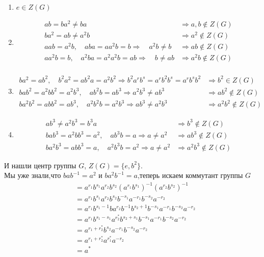 \documentclass[12pt]{article} %
\theoremstyle{neosn} %
\begin{document}
\begin{enumerate}
	\item $e \in Z(G)$
	\item \begin{align*}
		ab = ba^2 \neq ba &\Rightarrow a,b \notin Z(G) \\
		ba^2=ab\neq a^2b &\Rightarrow a^2 \notin Z(G) \\
		aab=a^2b, \quad aba = aa^2b=b \Rightarrow \quad a^2b \neq b &\Rightarrow ab \notin Z(G)\\
		aa^2b=b, \quad a^2ba=a^2a^2b=ab \Rightarrow \quad b \neq ab &\Rightarrow a^2b \notin Z(G)\\
	\end{align*}
	\item \begin{align*}
		ba^2 = ab^2,\quad b^2a^2=ab^2a=a^2b^2 \Rightarrow b^2a^rb^s=a^rb^2b^s=a^rb^sb^2 &\Rightarrow b^2 \in Z(G)\\
		bab^2=a^2bb^2=a^2b^3,\quad ab^2b=ab^3 \Rightarrow a^2b^3 \neq ab^3 &\Rightarrow ab^2 \notin Z(G)\\
		ba^2b^2=abb^2=ab^3, \quad a^2b^2b=a^2b^3 \Rightarrow ab^3\neq a^2b^3 &\Rightarrow a^2b^2 \notin Z(G)
	\end{align*}
	\item \begin{align*}
		ab^3\neq a^2b^3=b^3a &\Rightarrow b^3 \notin Z(G)\\
		bab^3=a^2bb^3=a^2, \quad ab^3b=a \Rightarrow a \neq a^2 &\Rightarrow ab^3 \notin Z(G)\\
		ba^2b^3=abb^3=a,\quad a^2b^3b=a^2 \Rightarrow a \neq a^2 &\Rightarrow a^2b^3 \notin Z(G)
	\end{align*}
\end{enumerate}
И нашли центр группы $G$, $Z(G)=\{e,b^2\}$.\\

Мы уже знали,что $bab^{-1}=a^2$ и $ba^2b^{-1}=a$,теперь искаем коммутант группы $G$
\begin{align*}
	[a^{r_1}b^{s_1},a^{r_2}b^{s_2}] &= a^{r_1}b^{s_1}a^{r_2}b^{s_2}(a^{r_1}b^{s_1})^{-1}(a^{r_2}b^{s_2})^{-1}\\
									&= a^{r_1}b^{s_1}a^{r_2}b^{s_2}b^{-s_1}a^{-r_1}b^{-s_2}a^{-r_2}\\
									&= a^{r_1}b^{s_1-1}ba^{r_2}b^{-1}b^{s_2+1}b^{-s_1}a^{-r_1}b^{-s_2}a^{-r_2}\\
									&= a^{r_1}b^{s_1-s_1}a^{r_2^*}b^{s_2+s_1}b^{-s_1}a^{-r_1}b^{-s_2}a^{-r_2}\\
									&= a^{r_1+r_2^*}b^{s_2}a^{-r_1}b^{-s_2}a^{-r_2}\\
									&= a^{r_1+r_2^*}a^{r_1^*}a^{-r_2}\\
									&= a^*
\end{align*}
\end{document}

